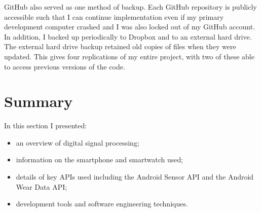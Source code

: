       GitHub also served as one method of backup. Each GitHub repository is publicly accessible such that I can continue implementation even if my primary development computer crashed and I was also locked out of my GitHub account. In addition, I backed up periodically to Dropbox and to an external hard drive. The external hard drive backup retained old copies of files when they were updated. This gives four replications of my entire project, with two of these able to access previous versions of the code.  
  \section{Summary}
    In this section I presented:
    \begin{itemize}
      \item an overview of digital signal processing;
      \item information on the smartphone and smartwatch used;
      \item details of key APIs used including the Android Sensor API and the Android Wear Data API;
      \item development tools and software engineering techniques.
    \end{itemize}
